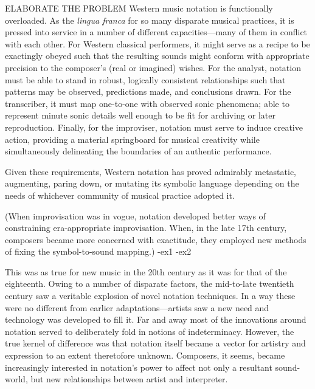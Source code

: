 
ELABORATE THE PROBLEM
Western music notation is functionally overloaded.
As the \textit{lingua franca} for so many disparate musical practices, it is pressed into service in a number of different capacities---many of them in conflict with each other.
For Western classical performers, it might serve as a recipe to be exactingly obeyed such that the resulting sounds might conform with appropriate precision to the composer's (real or imagined) wishes.
For the analyst, notation must be able to stand in robust, logically consistent relationships such that patterns may be observed, predictions made, and conclusions drawn.
For the transcriber, it must map one-to-one with observed sonic phenomena; able to represent minute sonic details well enough to be fit for archiving or later reproduction.
Finally, for the improviser, notation must serve to induce creative action, providing a material springboard for musical creativity while simultaneously delineating the boundaries of an authentic performance.

Given these requirements, Western notation has proved admirably metastatic, augmenting, paring down, or mutating its symbolic language depending on the needs of whichever community of musical practice adopted it.

    (When improvisation was in vogue, notation developed better ways of constraining era-appropriate improvisation. When, in the late 17th century, composers became more concerned with exactitude, they employed new methods of fixing the symbol-to-sound mapping.)
    -ex1
    -ex2


This was as true for new music in the 20th century as it was for that of the eighteenth. 
Owing to a number of disparate factors, the mid-to-late twentieth century saw a veritable explosion of novel notation techniques.
In a way these were no different from earlier adaptations---artists saw a new need and technology was developed to fill it.
Far and away most of the innovations around notation served to deliberately fold in notions of indeterminacy.
However, the true kernel of difference was that notation itself became a vector for artistry and expression to an extent theretofore unknown.
Composers, it seems, became increasingly interested in notation's power to affect not only a resultant sound-world, but new relationships between artist and interpreter.

